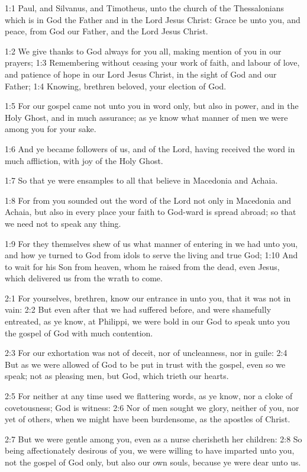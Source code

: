 

1:1 Paul, and Silvanus, and Timotheus, unto the church of the Thessalonians which is in God the Father and in the Lord Jesus Christ: Grace be unto you, and peace, from God our Father, and the Lord Jesus Christ.

1:2 We give thanks to God always for you all, making mention of you in our prayers; 1:3 Remembering without ceasing your work of faith, and labour of love, and patience of hope in our Lord Jesus Christ, in the sight of God and our Father; 1:4 Knowing, brethren beloved, your election of God.

1:5 For our gospel came not unto you in word only, but also in power, and in the Holy Ghost, and in much assurance; as ye know what manner of men we were among you for your sake.

1:6 And ye became followers of us, and of the Lord, having received the word in much affliction, with joy of the Holy Ghost.

1:7 So that ye were ensamples to all that believe in Macedonia and Achaia.

1:8 For from you sounded out the word of the Lord not only in Macedonia and Achaia, but also in every place your faith to God-ward is spread abroad; so that we need not to speak any thing.

1:9 For they themselves shew of us what manner of entering in we had unto you, and how ye turned to God from idols to serve the living and true God; 1:10 And to wait for his Son from heaven, whom he raised from the dead, even Jesus, which delivered us from the wrath to come.

2:1 For yourselves, brethren, know our entrance in unto you, that it was not in vain: 2:2 But even after that we had suffered before, and were shamefully entreated, as ye know, at Philippi, we were bold in our God to speak unto you the gospel of God with much contention.

2:3 For our exhortation was not of deceit, nor of uncleanness, nor in guile: 2:4 But as we were allowed of God to be put in trust with the gospel, even so we speak; not as pleasing men, but God, which trieth our hearts.

2:5 For neither at any time used we flattering words, as ye know, nor a cloke of covetousness; God is witness: 2:6 Nor of men sought we glory, neither of you, nor yet of others, when we might have been burdensome, as the apostles of Christ.

2:7 But we were gentle among you, even as a nurse cherisheth her children: 2:8 So being affectionately desirous of you, we were willing to have imparted unto you, not the gospel of God only, but also our own souls, because ye were dear unto us.

